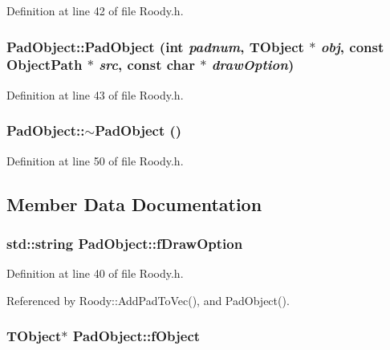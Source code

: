 Definition at line 42 of file Roody.h.
\subsubsection[{PadObject}]{\setlength{\rightskip}{0pt plus 5cm}PadObject::PadObject (int {\em padnum}, \/  TObject $\ast$ {\em obj}, \/  const ObjectPath $\ast$ {\em src}, \/  const char $\ast$ {\em drawOption})\hspace{0.3cm}{\ttfamily  [inline]}}\label{structPadObject_a285c91c90c38d5ad73fe4861a565b2f5}


Definition at line 43 of file Roody.h.
\subsubsection[{$\sim$PadObject}]{\setlength{\rightskip}{0pt plus 5cm}PadObject::$\sim$PadObject ()\hspace{0.3cm}{\ttfamily  [inline]}}\label{structPadObject_a47f5972c71458c252b2feadd9c8511a0}


Definition at line 50 of file Roody.h.

\subsection{Member Data Documentation}
\subsubsection[{fDrawOption}]{\setlength{\rightskip}{0pt plus 5cm}std::string {\bf PadObject::fDrawOption}}\label{structPadObject_ab4a27ba00cd3669e80ab4b242c949db2}


Definition at line 40 of file Roody.h.

Referenced by Roody::AddPadToVec(), and PadObject().
\subsubsection[{fObject}]{\setlength{\rightskip}{0pt plus 5cm}TObject$\ast$ {\bf PadObject::fObject}}\label{structPadObject_a8032e91fa662ac8f50a13350083d401d}



